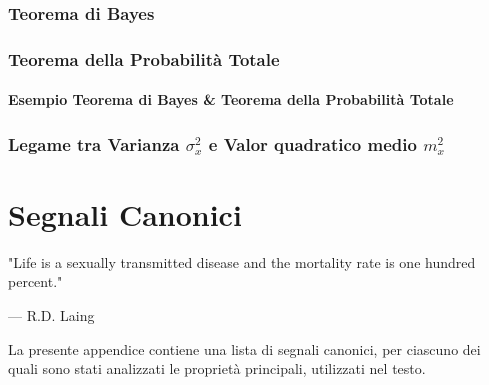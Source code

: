 \documentclass[12pt,oneside,openany]{memoir}
\numberwithin{equation}{subsection}
\begin{document}
\newpage
\subsection{Teorema di Bayes}

\newpage
\subsection{Teorema della Probabilit\`a Totale}

\newpage
\subsubsection{Esempio Teorema di Bayes \& Teorema della Probabilit\`a Totale}

\newpage
\subsection{Legame tra Varianza $\sigma_x^2$ e Valor quadratico medio $m_x^2$}

\appendix
\chapter{Segnali Canonici}
\epigraph{"Life is a sexually transmitted disease and the mortality rate is one hundred percent."}{--- \textup{R.D. Laing}}
La presente appendice contiene una lista di segnali canonici, per ciascuno dei quali sono stati analizzati le propriet\`a principali, utilizzati nel testo.
\end{document}
